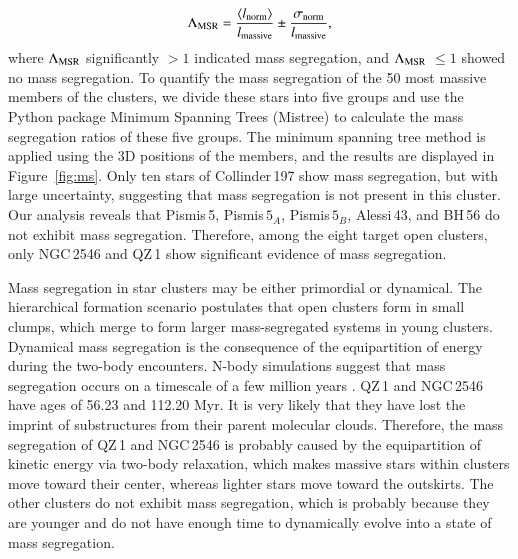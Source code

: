 \documentclass{aa} %
\begin{document}
 \begin{equation}
{\Lambda}_{\rm MSR} ={\frac{  \langle  l_{\rm norm}  \rangle }{ l_{\rm massive}}} \pm {\frac{  \sigma _{\rm norm}}{ l_{\rm massive}}},
    \end{equation}
where $\Lambda _{\rm MSR}$ significantly $ > 1$ indicated mass segregation, and $\Lambda _{\rm MSR}$ 
$\leq  1$ showed no mass segregation. To quantify the mass segregation of the 
50 most massive members of the clusters, we divide these stars into five groups and use 
the Python package Minimum Spanning Trees (Mistree) \citep{2019JOSS....4.1721N} to calculate the mass segregation 
ratios of these five groups. The minimum spanning tree method is applied using the 3D 
positions of the members, and the results are displayed in Figure~\ref{fig:ms}.
Only ten stars of Collinder\,197 show mass segregation, but with large uncertainty, suggesting that mass segregation is not present in this cluster. Our analysis reveals that Pismis\,5, Pismis\,$5_A$, Pismis\,$5_B$, Alessi\,43, and BH\,56 do not exhibit mass segregation. Therefore, among the eight target open clusters, only NGC\,2546 and QZ\,1 show significant evidence of mass segregation.


Mass segregation in star clusters may be either primordial or dynamical. The 
hierarchical formation scenario postulates that open clusters form in small clumps, which merge 
to form larger mass-segregated systems in young clusters. Dynamical mass segregation is 
the consequence of the equipartition of energy during the two-body encounters. N-body 
simulations suggest that mass segregation occurs on a timescale of a few million years \citep{2022A&A...659A..59T}.
QZ\,1 and NGC\,2546 have ages of 56.23 and 112.20 Myr. It is very likely that they have lost the 
imprint of substructures from their parent molecular clouds. Therefore, the mass segregation 
of QZ\,1 and NGC\,2546 is probably caused by the equipartition of kinetic energy via two-body relaxation,
which makes massive stars within clusters move toward their center, whereas lighter stars move toward the 
outskirts. The other clusters do not exhibit mass segregation, which is probably because they are younger and do not have enough time to dynamically evolve into a state of mass segregation.



\end{document}
